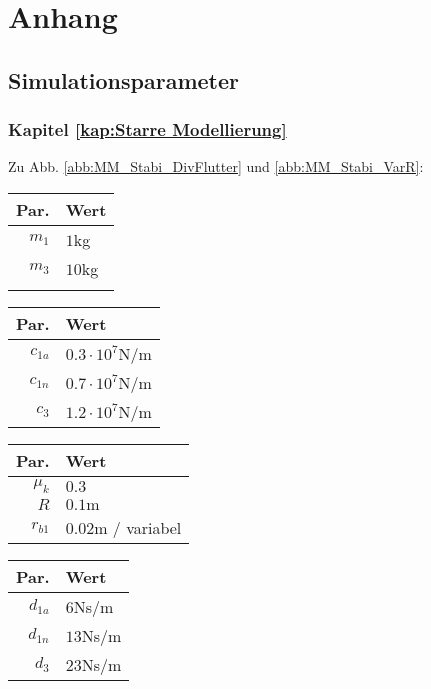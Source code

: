 \cleardoublepage
{}
\thispagestyle{empty}

\part*{Anhang}

\setcounter{page}{165}
\chapter{Simulationsparameter} \label{kap:Zahlenwerte}
\section{Kapitel \ref{kap:Starre Modellierung}}
Zu Abb. \ref{abb:MM_Stabi_DivFlutter} und \ref{abb:MM_Stabi_VarR}: 
\begin{center}
\begin{tabular}{r|l}
Par. &Wert\\\hline
$m_1$&$1$kg\\
$m_3$&$10$kg\\
&
\end{tabular}\hfill
\begin{tabular}{r|l}
Par. &Wert\\\hline
$c_{1a}$&$0.3\cdot10^{7}$N/m\\
$c_{1n}$&$0.7\cdot10^{7}$N/m \\
$c_{3}$ &$1.2\cdot10^{7}$N/m
\end{tabular}\hfill
\begin{tabular}{r|l}
Par. &Wert\\\hline
$\mu_k$& $0.3$\\
$R$&$0.1\textrm{m}$ \\
$r_{b1}$&$ 0.02\textrm{m}$ / variabel
\end{tabular}\hfill
\begin{tabular}{r|l}
Par. &Wert\\\hline
$d_{1a}$&$6$Ns/m\\
$d_{1n}$&$13$Ns/m\\
$d_{3}$&$23$Ns/m
\end{tabular}
\end{center}

